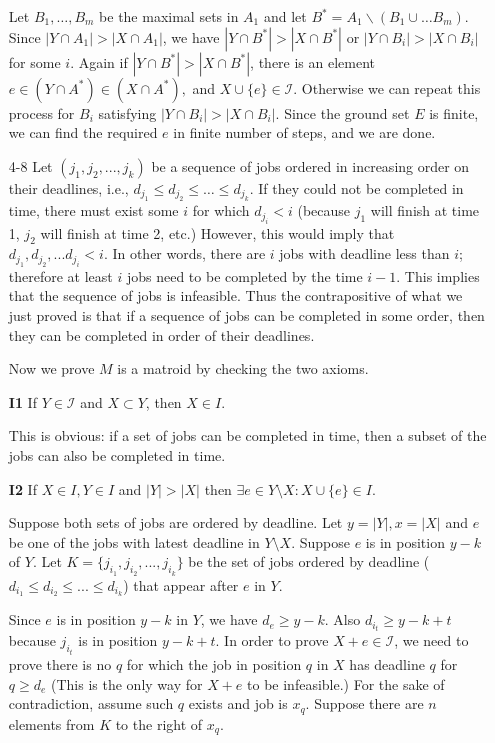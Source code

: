 \documentclass[12pt]{article}
\newcommand{\I}{\mathcal I}
\begin{document}
\begin{enumerate}
Let $B_1,\ldots,B_m$ be the maximal sets in $A_1$ and let
$B^{*}=A_1\backslash(B_1\cup \ldots B_m)$. Since $|Y\cap
A_1|>|X\cap A_1|$, we have $|Y\cap B^{*}|>|X\cap B^{*}|$ or $|Y\cap
B_i|>|X\cap B_i|$ for some $i$. Again if $|Y\cap B^{*}|>|X\cap
B^{*}|$, there is an element $e \in (Y\cap A^{*})\in (X\cap A^{*}),$
and $X \cup \{e\}\in \mathcal{I}.$ Otherwise we can repeat this process
for $B_i$ satisfying $|Y\cap B_i|>|X\cap B_i|$. Since the ground set
$E$ is finite, we can find the required $e$ in finite number of
steps, and we are done.
\item[4-8] %
Let $(j_1, j_2, ..., j_k)$ be a sequence of jobs ordered in increasing order on their deadlines, i.e., $d_{j_1}\leq d_{j_2}\leq \ldots\leq d_{j_k}$. If they could not be completed in time, there must exist some $i$ for which $d_{j_i} < i$ (because $j_1$ will finish at time 1, $j_2$ will finish at time 2, etc.) However, this would imply that $d_{j_1}, d_{j_2}, ... d_{j_i} < i$.
	In other words, there are $i$ jobs with deadline less than $i$; therefore at least $i$ jobs need to be completed by the time $i-1$. This implies that the sequence of jobs is infeasible. Thus the contrapositive of what we just proved is that if a sequence of jobs can be completed in some order, then they can be completed in order of their deadlines.

Now we prove $M$ is a matroid by checking the two axioms.
		
{\bf I1} If $Y \in \I$ and $X \subset Y$, then $X \in I$.
	
This is obvious: if a set of jobs can be completed in time, then a subset of the jobs can also be completed in time.
	
{\bf I2} If $X \in I, Y \in I$ and $|Y| > |X|$ then $\exists e \in Y\setminus X : X \cup \{e\} \in I$.
	
Suppose both sets of jobs are ordered by deadline. Let $y  = |Y|, x = |X|$ and $e$ be one of the jobs with latest deadline in $Y \setminus X$. Suppose $e$ is in position $y-k$ of $Y$. Let $K = \{ j_{i_1}, j_{i_2}, ..., j_{i_k}\}$ be the set of jobs ordered by deadline ($d_{i_1} \leq d_{i_2} \leq ... \leq d_{i_k}$) that appear after $e$ in $Y$.
	
Since $e$ is in position $y-k$ in $Y$, we have $d_e \geq y-k$. Also $d_{i_t} \geq y - k + t$ because $j_{i_t}$ is in position $y - k + t$. In order to prove $X+e\in\I$, we need to prove there is no $q$ for which the job in position $q$ in $X$ has deadline $q$ for $q \geq d_e$ (This is the only way for $X+e$ to be infeasible.) For the sake of contradiction, assume such $q$ exists and job is $x_q$. Suppose there are $n$ elements from $K$ to the right of $x_q$. 
	

\end{enumerate}
\end{document}
